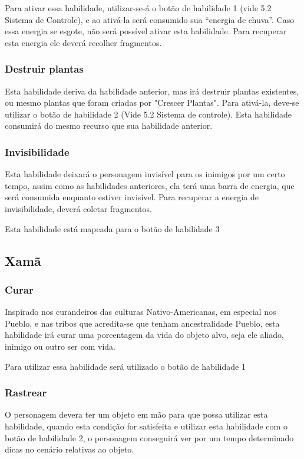 Para ativar essa habilidade, utilizar-se-á o botão de habilidade 1 (vide 5.2 Sistema de Controle), e ao ativá-la será consumido sua ``energia de chuva''. Caso essa energia se esgote, não será possível ativar esta habilidade. Para recuperar esta energia ele deverá recolher fragmentos.


\subsubsection{Destruir plantas}
Esta habilidade deriva da habilidade anterior, mas irá destruir plantas existentes, ou mesmo plantas que foram criadas por "Crescer Plantas". Para ativá-la, deve-se utilizar o botão de habilidade 2 (Vide 5.2 Sistema de controle). Esta  habilidade consumirá do mesmo recurso que sua habilidade anterior. 


\subsubsection{Invisibilidade}
Esta habilidade deixará o personagem invisível para os inimigos por um certo tempo, assim como as habilidades anteriores, ela terá uma barra de energia, que será consumida enquanto estiver invisível. Para recuperar a energia de invisibilidade, deverá coletar fragmentos.

Esta habilidade está mapeada para o botão de habilidade 3 



\subsection{Xamã}
\subsubsection{Curar}
Inspirado nos curandeiros das culturas Nativo-Americanas, em especial nos Pueblo, e nas tribos que acredita-se que tenham ancestralidade Pueblo, esta habilidade irá curar uma porcentagem da vida do objeto alvo, seja ele aliado, inimigo ou outro ser com vida.

Para utilizar essa habilidade será utilizado o botão de habilidade 1

\subsubsection{Rastrear}
O personagem devera ter um objeto em mão para que possa utilizar esta habilidade, quando esta condição for satisfeita e utilizar esta habilidade com o botão de habilidade 2, o personagem conseguirá ver por um tempo determinado dicas no cenário relativas ao objeto.

